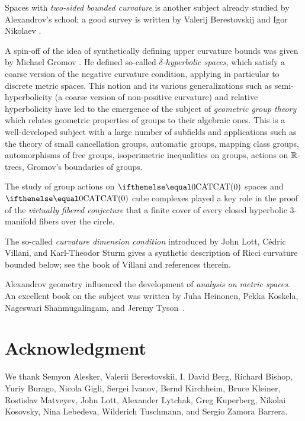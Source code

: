 Spaces with {}\emph{two-sided bounded curvature} is another subject already studied  by Alexandrov's school;
a good survey is written by Valerij Berestovskij and Igor Nikolaev \cite{berestovskii-nikolaev}.

A spin-off of the idea of synthetically defining upper curvature bounds 
was given by Michael Gromov \cite{gromov:hyp-groups}. 
He  defined so-called  {}\emph{$\delta$-hyperbolic spaces}, which satisfy   a coarse version of the  negative curvature condition, applying  in particular to discrete metric spaces.
This notion and its various generalizations such as semi-hyperbolicity (a coarse version of non-positive curvature) and relative hyperbolicity have  led to the emergence of the subject of {}\emph{geometric group theory} which relates geometric properties of groups to their algebraic ones.
This is a well-developed subject with a large number of subfields and applications such as the theory of small cancellation groups, automatic groups,  mapping class groups, automorphisms of free groups, isoperimetric inequalities on groups, actions on $\mathbb{R}$-trees, Gromov's boundaries of groups.

The study of group actions on $\CAT 0$ spaces and $\CAT 0$ cube complexes played a key role in the proof of the {}\emph{virtually fibered conjecture} that a finite cover of  every closed hyperbolic 3-manifold fibers over the circle.

{\sloppy

The so-called {}\emph{curvature dimension condition} introduced by John Lott, C\'edric Villani, and Karl-Theodor Sturm gives a synthetic description of Ricci curvature bounded below; see the book of Villani \cite{villani} and references therein.

Alexandrov geometry influenced the development of {}\emph{analysis on metric spaces}. 
An excellent book on the subject was written by Juha Heinonen, Pekka Koskela, Nageswari Shanmugalingam, and Jeremy Tyson~\cite{heinonen-koskela-shanmugalingam-tyson}.

}

\section*{Acknowledgment}
We thank 
Semyon Alesker,
Valerii Berestovskii,
I. David Berg,
Richard Bishop, 
Yuriy Burago, 
Nicola Gigli,
Sergei Ivanov,
Bernd Kirchheim, 
Bruce Kleiner, 
Rostislav Matveyev,
John Lott,
Alexander Lytchak, 
Greg Kuperberg, 
Nikolai Kosovsky, 
Nina Lebedeva,
Wilderich Tuschmann, 
and
Sergio Zamora Barrera.

